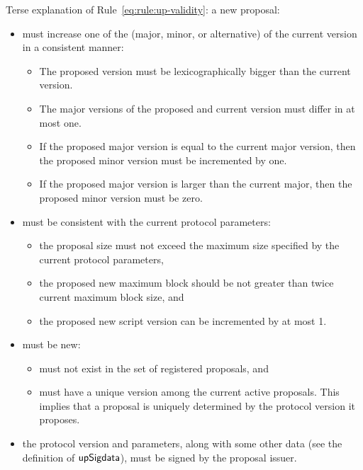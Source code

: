 Terse explanation of Rule~\ref{eq:rule:up-validity}: a new proposal:
\begin{itemize}
\item must increase one of the (major, minor, or alternative) of the
  current version in a consistent manner:
  \begin{itemize}
  \item The proposed version must be lexicographically bigger than the current
    version.
  \item The major versions of the proposed and current version must differ in
    at most one.
  \item If the proposed major version is equal to the current major
    version, then the proposed minor version must be incremented by one.
  \item If the proposed major version is larger than the current major, then
    the proposed minor version must be zero.
  \end{itemize}
\item must be consistent with the current protocol parameters:
  \begin{itemize}
  \item the proposal size must not exceed the maximum size specified by
    the current protocol parameters,
  \item the proposed new maximum block should be not greater than twice current
    maximum block size, and
  \item the proposed new script version can be incremented by at most 1.
  \end{itemize}
\item must be new:
  \begin{itemize}
  \item must not exist in the set of registered proposals, and
  \item must have a unique version among the current active proposals. This
    implies that a proposal is uniquely determined by the protocol version it
    proposes.
  \end{itemize}
\item the protocol version and parameters, along with some other data (see the
  definition of $\mathsf{upSigdata}$), must be signed by the proposal issuer.
\end{itemize}


